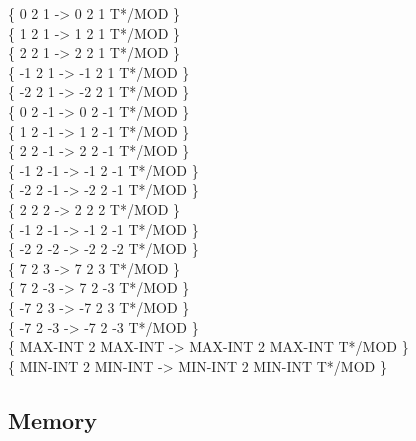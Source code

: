 \begin{tt}
\{       0 2       1  ->       0 2       1 T*/MOD \} \\
\{       1 2       1  ->       1 2       1 T*/MOD \} \\
\{       2 2       1  ->       2 2       1 T*/MOD \} \\
\{      -1 2       1  ->      -1 2       1 T*/MOD \} \\
\{      -2 2       1  ->      -2 2       1 T*/MOD \} \\
\{       0 2      -1  ->       0 2      -1 T*/MOD \} \\
\{       1 2      -1  ->       1 2      -1 T*/MOD \} \\
\{       2 2      -1  ->       2 2      -1 T*/MOD \} \\
\{      -1 2      -1  ->      -1 2      -1 T*/MOD \} \\
\{      -2 2      -1  ->      -2 2      -1 T*/MOD \} \\
\{       2 2       2  ->       2 2       2 T*/MOD \} \\
\{      -1 2      -1  ->      -1 2      -1 T*/MOD \} \\
\{      -2 2      -2  ->      -2 2      -2 T*/MOD \} \\
\{       7 2       3  ->       7 2       3 T*/MOD \} \\
\{       7 2      -3  ->       7 2      -3 T*/MOD \} \\
\{      -7 2       3  ->      -7 2       3 T*/MOD \} \\
\{      -7 2      -3  ->      -7 2      -3 T*/MOD \} \\
\{ MAX-INT 2 MAX-INT  -> MAX-INT 2 MAX-INT T*/MOD \} \\
\{ MIN-INT 2 MIN-INT  -> MIN-INT 2 MIN-INT T*/MOD \} \\
\end{tt}

\subsection{Memory}


